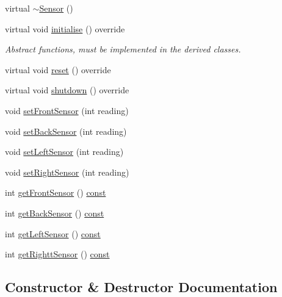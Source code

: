 \begin{DoxyCompactItemize}
\item 
virtual \hyperlink{class_sensor_aa730e9961dd645e9df9644c52b6e72eb}{$\sim$\+Sensor} ()
\item 
virtual void \hyperlink{class_sensor_a1981728b94cedfd65164764371a58167}{initialise} () override
\begin{DoxyCompactList}\small\item\em Abstract functions, must be implemented in the derived classes. \end{DoxyCompactList}\item 
virtual void \hyperlink{class_sensor_ad12d404938f4256288a1abc0dcd08a08}{reset} () override
\item 
virtual void \hyperlink{class_sensor_a2153dd640ccb648a912a9ef5dd50958e}{shutdown} () override
\item 
void \hyperlink{class_sensor_a232cfa2eba02b76485a79c056823add6}{set\+Front\+Sensor} (int reading)
\item 
void \hyperlink{class_sensor_ab473ccb1bf431fa351557c5c9de3dd42}{set\+Back\+Sensor} (int reading)
\item 
void \hyperlink{class_sensor_aa801b7317f2185df148903d99a421555}{set\+Left\+Sensor} (int reading)
\item 
void \hyperlink{class_sensor_af82bc6d823e34180bfcd6e4d33452d2c}{set\+Right\+Sensor} (int reading)
\item 
int \hyperlink{class_sensor_a0e4445ad2a53389b593c0cc980cbd0fa}{get\+Front\+Sensor} () \hyperlink{functions__c_8js_afacfd9c985d225bb07483b887a801b6f}{const} 
\item 
int \hyperlink{class_sensor_a2a6d9722dec48cbd3b1c7868e29f3da6}{get\+Back\+Sensor} () \hyperlink{functions__c_8js_afacfd9c985d225bb07483b887a801b6f}{const} 
\item 
int \hyperlink{class_sensor_a1a10f4b48c98e23a0e65dd161a0f6fd1}{get\+Left\+Sensor} () \hyperlink{functions__c_8js_afacfd9c985d225bb07483b887a801b6f}{const} 
\item 
int \hyperlink{class_sensor_a7e8723c2635a7eff0e130b4ca27451a7}{get\+Rightt\+Sensor} () \hyperlink{functions__c_8js_afacfd9c985d225bb07483b887a801b6f}{const} 
\end{DoxyCompactItemize}


\subsection{Constructor \& Destructor Documentation}
